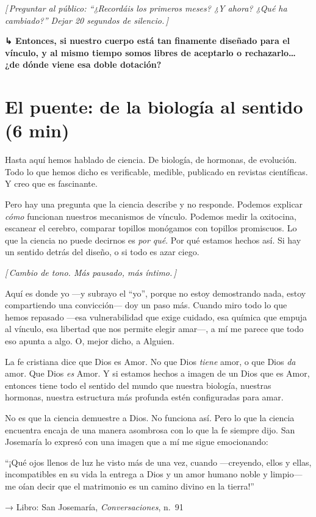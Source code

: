 \documentclass[a4paper, 11pt]{article}
\newcommand{\reflibro}[1]{%
  {\small\sffamily\color{gris} → Libro: #1}%
}
\newcommand{\nota}[1]{%
  \par\smallskip
  {\small\itshape\color{oro!80!black} [\,#1\,]}%
  \par\smallskip
}
\newcommand{\transicion}[1]{%
  \par\medskip
  {\sffamily\color{gris}\bfseries ↳ #1}%
  \par\medskip
}
\begin{document}
\nota{Preguntar al público: ``¿Recordáis los primeros meses? ¿Y ahora? ¿Qué ha cambiado?'' Dejar 20 segundos de silencio.}

\transicion{Entonces, si nuestro cuerpo está tan finamente diseñado para el vínculo, y al mismo tiempo somos libres de aceptarlo o rechazarlo\ldots{} ¿de dónde viene esa doble dotación?}

\section{El puente: de la biología al sentido (6 min)}

Hasta aquí hemos hablado de ciencia. De biología, de hormonas, de evolución. Todo lo que hemos dicho es verificable, medible, publicado en revistas científicas. Y creo que es fascinante.

Pero hay una pregunta que la ciencia describe y no responde. Podemos explicar \emph{cómo} funcionan nuestros mecanismos de vínculo. Podemos medir la oxitocina, escanear el cerebro, comparar topillos monógamos con topillos promiscuos. Lo que la ciencia no puede decirnos es \emph{por qué}. Por qué estamos hechos así. Si hay un sentido detrás del diseño, o si todo es azar ciego.

\nota{Cambio de tono. Más pausado, más íntimo.}

Aquí es donde yo ---y subrayo el ``yo'', porque no estoy demostrando nada, estoy compartiendo una convicción--- doy un paso más. Cuando miro todo lo que hemos repasado ---esa vulnerabilidad que exige cuidado, esa química que empuja al vínculo, esa libertad que nos permite elegir amar---, a mí me parece que todo eso apunta a algo. O, mejor dicho, a Alguien.

La fe cristiana dice que Dios es Amor. No que Dios \emph{tiene} amor, o que Dios \emph{da} amor. Que Dios \emph{es} Amor. Y si estamos hechos a imagen de un Dios que es Amor, entonces tiene todo el sentido del mundo que nuestra biología, nuestras hormonas, nuestra estructura más profunda estén configuradas para amar.

No es que la ciencia demuestre a Dios. No funciona así. Pero lo que la ciencia encuentra encaja de una manera asombrosa con lo que la fe siempre dijo. San Josemaría lo expresó con una imagen que a mí me sigue emocionando:

\begin{citalibro}
``¡Qué ojos llenos de luz he visto más de una vez, cuando ---creyendo, ellos y ellas, incompatibles en su vida la entrega a Dios y un amor humano noble y limpio--- me oían decir que el matrimonio es un camino divino en la tierra!''
\end{citalibro}
\reflibro{San Josemaría, \emph{Conversaciones}, n.~91}
\end{document}
